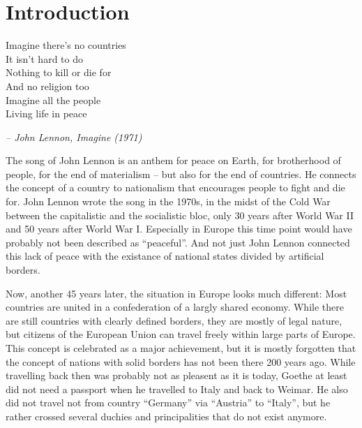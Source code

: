 

\chapter{Introduction} %
\label{cha:introduction}
\begin{large}
\begin{quoteit}
  Imagine there's no countries \\
  It isn't hard to do \\
  Nothing to kill or die for \\
  And no religion too \\
  Imagine all the people \\
  Living life in peace
\end{quoteit}
\end{large}
\hfill \textit{-- John Lennon, \emph{Imagine} (1971)}

The song of John Lennon is an anthem for peace on Earth, for brotherhood of people, for the end of materialism -- but also for the end of countries. He connects the concept of a country to nationalism that encourages people to fight and die for. John Lennon wrote the song in the 1970s, in the midst of the Cold War between the capitalistic and the socialistic bloc, only 30 years after World War II and 50 years after World War I. Especially in Europe this time point would have probably not been described as ``peaceful''. And not just John Lennon connected this lack of peace with the existance of national states divided by artificial borders.

Now, another 45 years later, the situation in Europe looks much different: Most countries are united in a confederation of a largly shared economy. While there are still countries with clearly defined borders, they are mostly of legal nature, but citizens of the European Union can travel freely within large parts of Europe. This concept is celebrated as a major achievement, but it is mostly forgotten that the concept of nations with solid borders has not been there 200 years ago. While travelling back then was probably not as pleasent as it is today, Goethe at least did not need a passport when he travelled to Italy and back to Weimar. He also did not travel not from country ``Germany'' via ``Austria'' to ``Italy'', but he rather crossed several duchies and principalities that do not exist anymore.

